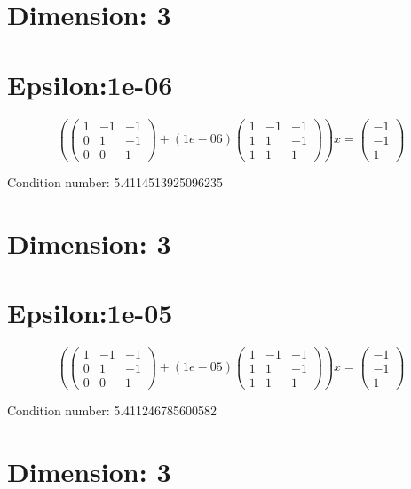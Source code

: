 \documentclass{article}%
\begin{document}
%
\normalsize%
\section{Dimension: 3}%
\label{sec:Dimension3}%
\section{Epsilon:1e{-}06}%
\label{sec:Epsilon1e{-}06}%
\[%
( \begin{pmatrix}%
1&-1&-1\\%
0&1&-1\\%
0&0&1%
\end{pmatrix} + ( 1e{-}06 ) \begin{pmatrix}%
1&-1&-1\\%
1&1&-1\\%
1&1&1%
\end{pmatrix} )x = \begin{pmatrix}%
-1\\%
-1\\%
1%
\end{pmatrix}%
\]%
\begin{Large}%
Condition number:%
5.4114513925096235%
\end{Large}

%
\section{Dimension: 3}%
\label{sec:Dimension3}%
\section{Epsilon:1e{-}05}%
\label{sec:Epsilon1e{-}05}%
\[%
( \begin{pmatrix}%
1&-1&-1\\%
0&1&-1\\%
0&0&1%
\end{pmatrix} + ( 1e{-}05 ) \begin{pmatrix}%
1&-1&-1\\%
1&1&-1\\%
1&1&1%
\end{pmatrix} )x = \begin{pmatrix}%
-1\\%
-1\\%
1%
\end{pmatrix}%
\]%
\begin{Large}%
Condition number:%
5.411246785600582%
\end{Large}

%
\section{Dimension: 3}%
\label{sec:Dimension3}%
\end{document}
